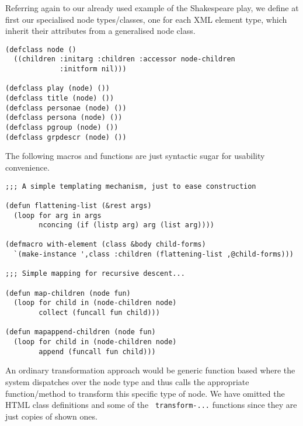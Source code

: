 \documentclass[a4paper,11pt]{scrartcl}
\begin{document}
Referring again to our already used example of the Shakespeare play,
we define at first our specialised node types/classes, one for each
XML element type, which inherit their attributes from a generalised
node class.
\begin{verbatim}
(defclass node ()
  ((children :initarg :children :accessor node-children 
             :initform nil)))

(defclass play (node) ())
(defclass title (node) ())
(defclass personae (node) ())
(defclass persona (node) ())
(defclass pgroup (node) ())
(defclass grpdescr (node) ())
\end{verbatim}

The following macros and functions are just syntactic sugar for
usability convenience.
\begin{verbatim}
;;; A simple templating mechanism, just to ease construction

(defun flattening-list (&rest args)
  (loop for arg in args
        nconcing (if (listp arg) arg (list arg))))

(defmacro with-element (class &body child-forms)
  `(make-instance ',class :children (flattening-list ,@child-forms)))

;;; Simple mapping for recursive descent...

(defun map-children (node fun)
  (loop for child in (node-children node) 
        collect (funcall fun child)))

(defun mapappend-children (node fun)
  (loop for child in (node-children node)
        append (funcall fun child)))
\end{verbatim}
An ordinary transformation approach would be generic function based
where the system dispatches over the node type and thus calls the
appropriate function/method to transform this specific type of node.
We have omitted the HTML class definitions and some of the {\tt
  transform-...} functions since they are just copies of shown ones.
\end{document}
